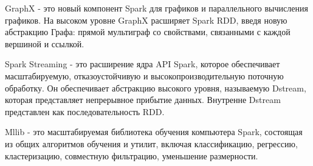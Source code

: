 GraphX ​​- это новый компонент Spark для графиков и параллельного вычисления графиков. На высоком уровне GraphX ​​расширяет Spark RDD, введя новую абстракцию Графа: прямой мультиграф со свойствами, связанными с каждой вершиной и ссылкой.

Spark Streaming - это расширение ядра API Spark, которое обеспечивает масштабируемую, отказоустойчивую и высокопроизводительную поточную обработку. Он обеспечивает абстракцию высокого уровня, называемую Dstream, которая представляет непрерывное прибытие данных. Внутренне Dstream представлен как последовательность RDD.

Mllib - это масштабируемая библиотека обучения компьютера Spark, состоящая из общих алгоритмов обучения и утилит, включая классификацию, регрессию, кластеризацию, совместную фильтрацию, уменьшение размерности.

